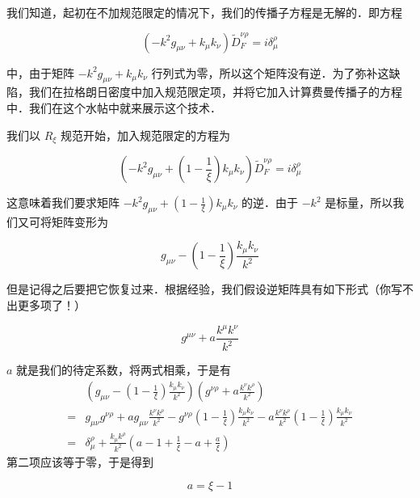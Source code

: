 

我们知道，起初在不加规范限定的情况下，我们的传播子方程是无解的．即方程

\begin{equation}
\left(-k^2 g_{\mu\nu}+k_\mu k_\nu\right)\tilde D^{\nu\rho}_F
=i\delta^\rho_\mu
\end{equation}

中，由于矩阵 $-k^2 g_{\mu\nu}+k_\mu k_\nu$ 行列式为零，所以这个矩阵没有逆．为了弥补这缺陷，我们在拉格朗日密度中加入规范限定项，并将它加入计算费曼传播子的方程中．我们在这个水帖中就来展示这个技术．

我们以 $R_\xi$ 规范开始，加入规范限定的方程为

\begin{equation}
\left(-k^2 g_{\mu\nu}+\left(1-\frac{1}{\xi}\right)k_\mu k_\nu\right)\tilde D^{\nu\rho}_F
=i\delta^\rho_\mu
\end{equation}

这意味着我们要求矩阵 $-k^2 g_{\mu\nu}+\left(1-\frac{1}{\xi}\right)k_\mu k_\nu$ 的逆．由于 $-k^2$ 是标量，所以我们又可将矩阵变形为

\begin{equation}
g_{\mu\nu}-\left(1-\frac{1}{\xi}\right)\frac{k_\mu k_\nu}{k^2}
\end{equation}

但是记得之后要把它恢复过来．根据经验，我们假设逆矩阵具有如下形式（你写不出更多项了！）

\begin{equation}
g^{\mu\nu}+a\frac{k^\mu k^\nu}{k^2}
\end{equation}

$a$ 就是我们的待定系数，将两式相乘，于是有
\begin{equation}
\begin{split}
&\left(g_{\mu\nu}-\left(1-\frac{1}{\xi}\right)\frac{k_\mu k_\nu}{k^2}\right)
\left(g^{\nu\rho}+a\frac{k^\nu k^\rho}{k^2}\right)\\
=&g_{\mu\nu}g^{\nu\rho}+
ag_{\mu\nu}\frac{k^\nu k^\rho}{k^2}-
g^{\nu\rho}\left(1-\frac{1}{\xi}\right)\frac{k_\mu k_\nu}{k^2}
-a\frac{k^\nu k^\rho}{k^2}\left(1-\frac{1}{\xi}\right)\frac{k_\mu k_\nu}{k^2}\\
=&\delta^\rho_\mu+\frac{k_\mu k^\rho}{k^2}
\left(
a-1+\frac{1}{\xi}-a+\frac{a}{\xi}
\right)
\end{split}
\end{equation}
第二项应该等于零，于是得到

\begin{equation}
a=\xi-1
\end{equation}

